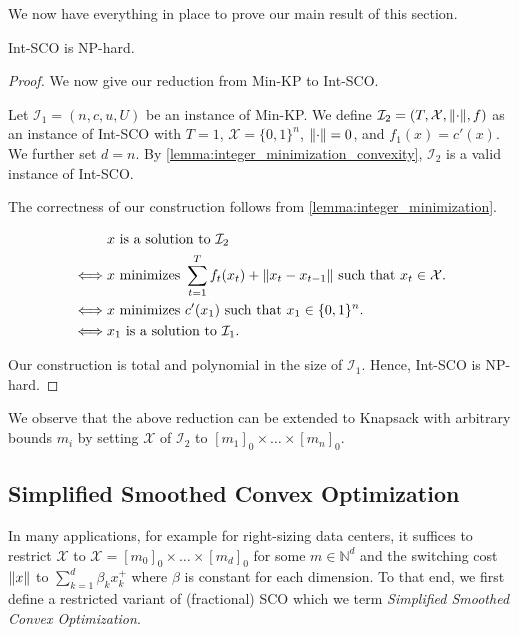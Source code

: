 We now have everything in place to prove our main result of this section.

\begin{theorem}
Int-SCO is NP-hard.
\end{theorem}

\begin{proof}
We now give our reduction from Min-KP to Int-SCO.

Let $\mathcal{I}_1 = (n, c, u, U)$ be an instance of Min-KP. We define $\mathcal{I}_2 = (T, \mathcal{X}, \lVert\cdot\rVert, f)$ as an instance of Int-SCO with $T = 1$, $\mathcal{X} = \{0,1\}^n$, $\lVert\cdot\rVert = 0$, and $f_1(x) = c'(x)$. We further set $d = n$. By \autoref{lemma:integer_minimization_convexity}, $\mathcal{I}_2$ is a valid instance of Int-SCO.

The correctness of our construction follows from \autoref{lemma:integer_minimization}.

\begin{align*}
         &x \text{ is a solution to } \mathcal{I}_2 \\
    \iff &x \text{ minimizes } \sum_{t=1}^T f_t(x_t) + \lVert x_t - x_{t-1}\rVert \text{ such that } x_t \in \mathcal{X}. \\
    \iff &x \text{ minimizes } c'(x_1) \text{ such that } x_1 \in \{0,1\}^n. \\
    \iff &x_1 \text{ is a solution to } \mathcal{I}_1.
\end{align*}

Our construction is total and polynomial in the size of $\mathcal{I}_1$. Hence, Int-SCO is NP-hard.
\end{proof}

We observe that the above reduction can be extended to Knapsack with arbitrary bounds $m_i$ by setting $\mathcal{X}$ of $\mathcal{I}_2$ to $[m_1]_0 \times \dots \times [m_n]_0$.

\subsection{Simplified Smoothed Convex Optimization}
\label{section:theory:simplified_smoothed_convex_optimization}

In many applications, for example for right-sizing data centers, it suffices to restrict $\mathcal{X}$ to $\mathcal{X} = [m_0]_0 \times \dots \times [m_d]_0$ for some $m \in \mathbb{N}^d$ and the switching cost $\lVert x\rVert$ to $\sum_{k=1}^d \beta_k x_k^+$ where $\beta$ is constant for each dimension. To that end, we first define a restricted variant of (fractional) SCO which we term \textit{Simplified Smoothed Convex Optimization}.


